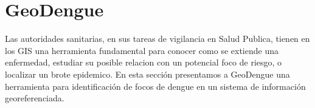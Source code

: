 \chapter{GeoDengue}
Las autoridades sanitarias, en sus tareas de vigilancia en Salud Publica, tienen en los GIS una
herramienta fundamental para conocer como se extiende una enfermedad, estudiar su posible relacion
con un potencial foco de riesgo, o localizar un brote epidemico\citep{vgomesAegis2001}. En esta sección presentamos a GeoDengue una herramienta para identificación de focos de dengue
en un sistema de información georeferenciada.

%




%




%

